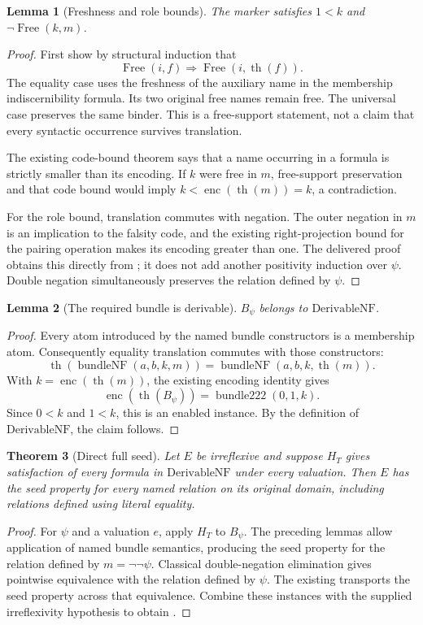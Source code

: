 \documentclass[11pt,letterpaper]{article}
\newtheorem{theorem}{Theorem}[section]
\newtheorem{lemma}[theorem]{Lemma}
\newcommand{\enc}{\operatorname{enc}}
\newcommand{\thh}{\operatorname{th}}
\newcommand{\Free}{\operatorname{Free}}
\newcommand{\code}[1]{\texttt{\detokenize{#1}}}
\begin{document}
\begin{lemma}[Freshness and role bounds]
The marker satisfies $1<k$ and $\neg\Free(k,m)$.
\end{lemma}
\begin{proof}
First show by structural induction that
\[
 \Free(i,f)\Longrightarrow\Free(i,\thh(f)).
\]
The equality case uses the freshness of the auxiliary name in the membership
indiscernibility formula. Its two original free names remain free. The universal
case preserves the same binder. This is a free-support statement, not a claim
that every syntactic occurrence survives translation.

The existing code-bound theorem says that a name occurring in a formula is
strictly smaller than its encoding. If $k$ were free in $m$, free-support
preservation and that code bound would imply
$k<\enc(\thh(m))=k$, a contradiction.

For the role bound, translation commutes with negation. The outer negation in
$m$ is an implication to the falsity code, and the existing right-projection
bound for the pairing operation makes its encoding greater than one. The
delivered proof obtains this directly from \code{le_P_right}; it does not add
another positivity induction over $\psi$. Double negation simultaneously
preserves the relation defined by $\psi$.
\end{proof}

\begin{lemma}[The required bundle is derivable]
$B_\psi$ belongs to $\mathrm{DerivableNF}$.
\end{lemma}
\begin{proof}
Every atom introduced by the named bundle constructors is a membership atom.
Consequently equality translation commutes with those constructors:
\[
 \thh(\operatorname{bundleNF}(a,b,k,m))
  =\operatorname{bundleNF}(a,b,k,\thh(m)).
\]
With $k=\enc(\thh(m))$, the existing encoding identity gives
\[
 \enc(\thh(B_\psi))=\operatorname{bundle222}(0,1,k).
\]
Since $0<k$ and $1<k$, this is an enabled \code{C222.bundle} instance. By the
definition of $\mathrm{DerivableNF}$, the claim follows.
\end{proof}

\begin{theorem}[Direct full seed]
Let $E$ be irreflexive and suppose $H_T$ gives satisfaction of every formula in
$\mathrm{DerivableNF}$ under every valuation. Then $E$ has the seed property for
every named relation on its original domain, including relations defined using
literal equality.
\end{theorem}
\begin{proof}
For $\psi$ and a valuation $e$, apply $H_T$ to $B_\psi$. The preceding lemmas
allow application of named bundle semantics, producing the seed property for
the relation defined by $m=\neg\neg\psi$. Classical double-negation elimination
gives pointwise equivalence with the relation defined by $\psi$. The existing
\code{seedProp_congr} transports the seed property across that equivalence.
Combine these instances with the supplied irreflexivity hypothesis to obtain
\code{FullSeed mem}.
\end{proof}
\end{document}
